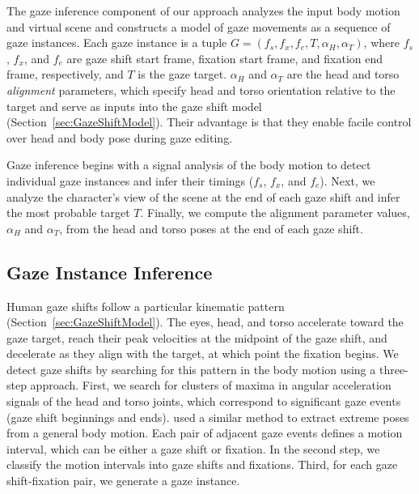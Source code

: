 The gaze inference component of our approach analyzes the input body motion and virtual scene and constructs a model of gaze movements as a sequence of gaze instances. Each gaze instance is a tuple $G = (f_s, f_x, f_e, T, \alpha_{H}, \alpha_{T})$, where $f_s$, $f_x$, and $f_e$ are gaze shift start frame, fixation start frame, and fixation end frame, respectively, and $T$ is the gaze target. $\alpha_{H}$ and $\alpha_{T}$ are the head and  torso \emph{alignment} parameters, which specify head and torso orientation relative to the target and serve as inputs into the gaze shift model (Section~\ref{sec:GazeShiftModel}). Their advantage is that they enable facile control over head and body pose during gaze editing.

Gaze inference begins with a signal analysis of the body motion to detect individual gaze instances and infer their timings ($f_s$, $f_x$, and $f_e$). Next, we analyze the character's view of the scene at the end of each gaze shift and infer the most probable target $T$. Finally, we compute the alignment parameter values, $\alpha_{H}$ and $\alpha_{T}$, from the head and torso poses at the end of each gaze shift.

\subsection{Gaze Instance Inference}
\label{sec:GazeTimingInference}

Human gaze shifts follow a particular kinematic pattern (Section~\ref{sec:GazeShiftModel}). The eyes, head, and torso accelerate toward the gaze target, reach their peak velocities at the midpoint of the gaze shift, and decelerate as they align with the target, at which point the fixation begins. We detect gaze shifts by searching for this pattern in the body motion using a three-step approach. First, we search for clusters of maxima in angular acceleration signals of the head and torso joints, which correspond to significant gaze events (gaze shift beginnings and ends). \citet{coleman2008staggered} used a similar method to extract extreme poses from a general body motion. Each pair of adjacent gaze events defines a motion interval, which can be either a gaze shift or fixation. In the second step, we classify the motion intervals into gaze shifts and fixations. Third, for each gaze shift-fixation pair, we generate a gaze instance.

